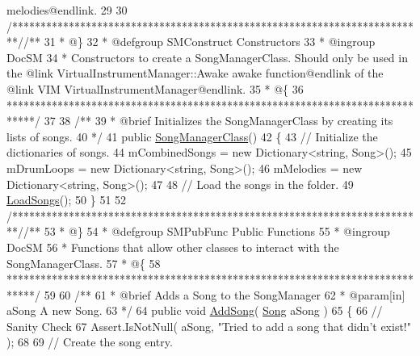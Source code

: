 \begin{DoxyCodeInclude}
{       melodies@endlink.}
29 \textcolor{comment}{}
30     \textcolor{comment}{/*************************************************************************/}\textcolor{comment}{/** }
31 \textcolor{comment}{     * @\}}
32 \textcolor{comment}{     * @defgroup SMConstruct Constructors}
33 \textcolor{comment}{     * @ingroup DocSM}
34 \textcolor{comment}{     * Constructors to create a SongManagerClass. Should only be used in the @link
       VirtualInstrumentManager::Awake awake function@endlink of the @link VIM VirtualInstrumentManager@endlink.}
35 \textcolor{comment}{     * @\{}
36 \textcolor{comment}{    *****************************************************************************/}
37 \textcolor{comment}{}
38 \textcolor{comment}{    /**}
39 \textcolor{comment}{     * @brief Initializes the SongManagerClass by creating its lists of songs.}
40 \textcolor{comment}{    */}
41     \textcolor{keyword}{public} \hyperlink{group___s_m_construct_gacd94623c6402ad7c7af2f725265d0e4d}{SongManagerClass}()
42     \{
43         \textcolor{comment}{// Initialize the dictionaries of songs.}
44         mCombinedSongs = \textcolor{keyword}{new} Dictionary<string, Song>();
45         mDrumLoops = \textcolor{keyword}{new} Dictionary<string, Song>();
46         mMelodies = \textcolor{keyword}{new} Dictionary<string, Song>();
47 
48         \textcolor{comment}{// Load the songs in the folder.}
49         \hyperlink{group___s_m_priv_func_ga73d6d3b38a160fd73b63b786b9cd384a}{LoadSongs}();
50     \}
51 
52     \textcolor{comment}{/*************************************************************************/}\textcolor{comment}{/** }
53 \textcolor{comment}{     * @\}}
54 \textcolor{comment}{     * @defgroup SMPubFunc Public Functions}
55 \textcolor{comment}{     * @ingroup DocSM}
56 \textcolor{comment}{     * Functions that allow other classes to interact with the SongManagerClass.}
57 \textcolor{comment}{     * @\{}
58 \textcolor{comment}{    *****************************************************************************/}
59 \textcolor{comment}{}
60 \textcolor{comment}{    /**}
61 \textcolor{comment}{     * @brief Adds a Song to the SongManager}
62 \textcolor{comment}{     * @param[in] aSong A new Song.}
63 \textcolor{comment}{    */}
64     \textcolor{keyword}{public} \textcolor{keywordtype}{void} \hyperlink{group___s_m_pub_func_ga1a228cb2a64e55448ccf9d1d618f05b7}{AddSong}( \hyperlink{class_song}{Song} aSong )
65     \{
66         \textcolor{comment}{// Sanity Check}
67         Assert.IsNotNull( aSong, \textcolor{stringliteral}{"Tried to add a song that didn't exist!"} );
68 
69         \textcolor{comment}{// Create the song entry.}

\end{DoxyCodeInclude}
